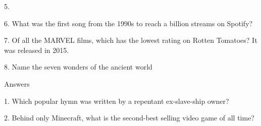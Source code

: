 \begin{frame}
\begin{center}
\Large
5. 
\end{center}
\end{frame}
\begin{frame}
\begin{center}
\Large
6. What was the first song from the 1990s to reach a billion streams on Spotify?
\end{center}
\end{frame}
\begin{frame}
\begin{center}
\Large
7. Of all the MARVEL films, which has the lowest rating on Rotten Tomatoes? It was released in 2015.
\end{center}
\end{frame}
\begin{frame}
\begin{center}
\Large
8. Name the seven wonders of the ancient world
\end{center}
\end{frame}
\begin{frame}
\begin{center}
\Huge
Answers
\end{center}
\end{frame}
\begin{frame}
\begin{center}
\Large
1. Which popular hymn was written by a repentant ex-slave-ship owner?
\\
\end{center}
\end{frame}
\begin{frame}
\begin{center}
\Large
2. Behind only Minecraft, what is the second-best selling video game of all time?
\\
\\
\end{center}
\end{frame}
